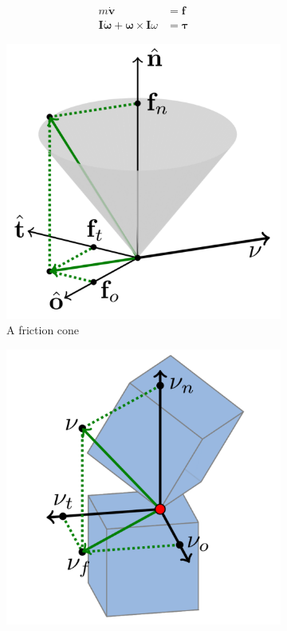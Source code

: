 \begin{align}
m\dot{\mathbf{v}} &= \mathbf{f}\\
\mathbf{I}\dot{\mathbf{\omega}} + \mathbf{\omega} \times \mathbf{I}\omega &= \mathbf{\tau}
\end{align}

\begin{figure}[htp]
\center
\begin{subfigure}[b]{0.45\textwidth}
	\includegraphics[width=\textwidth]{figures/friction_cone}
	\caption{A friction cone}
	\label{fig:friction_cone}
\end{subfigure}
\hfill
\begin{subfigure}[b]{0.47\textwidth}
	\includegraphics[width=\textwidth]{figures/friction_cube}

\end{subfigure}
\end{figure}

